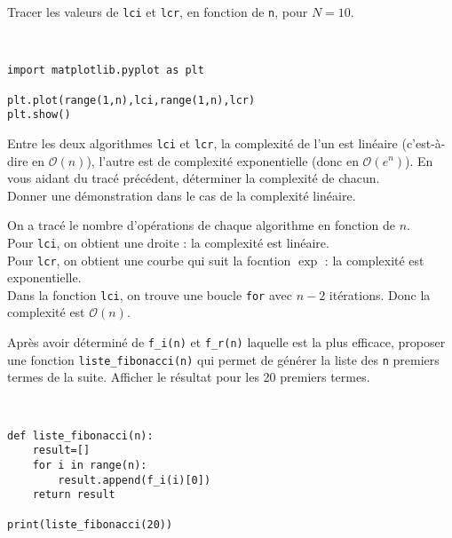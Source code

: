 \begin{exercice}
Tracer les valeurs de \verb?lci? et \verb?lcr?, en fonction de \verb?n?, pour $N=10$.
\end{exercice}

\begin{solution}~\ 
\begin{verbatim}
import matplotlib.pyplot as plt

plt.plot(range(1,n),lci,range(1,n),lcr)
plt.show()
\end{verbatim}
\end{solution}

\begin{exercice}
Entre les deux algorithmes \verb?lci? et \verb?lcr?, la complexité de l'un est linéaire (c'est-à-dire en $\mathcal{O}(n)$), l'autre est de complexité exponentielle (donc en $\mathcal{O}(e^n)$). En vous aidant du tracé précédent, déterminer la complexité de chacun.\\
Donner une démonstration dans le cas de la complexité linéaire.
\end{exercice}

\begin{solution}
On a tracé le nombre d'opérations de chaque algorithme en fonction de $n$. \\
Pour \verb?lci?, on obtient une droite : la complexité est linéaire.\\
Pour \verb?lcr?, on obtient une courbe qui suit la focntion $\exp$ : la complexité est exponentielle.\\
Dans la fonction \verb?lci?, on trouve une boucle \verb?for? avec $n-2$ itérations. Donc la complexité est $\mathcal{O}(n)$.
\end{solution}

\begin{exercice}
Après avoir déterminé de \verb?f_i(n)? et \verb?f_r(n)? laquelle est la plus efficace, proposer une fonction \verb?liste_fibonacci(n)? qui permet de générer la liste des \verb?n? premiers termes de la suite. Afficher le résultat pour les 20 premiers termes.
\end{exercice}

\begin{solution}~\ 
\begin{verbatim}
def liste_fibonacci(n):
    result=[]
    for i in range(n):
        result.append(f_i(i)[0])
    return result

print(liste_fibonacci(20))
\end{verbatim}
\end{solution}

